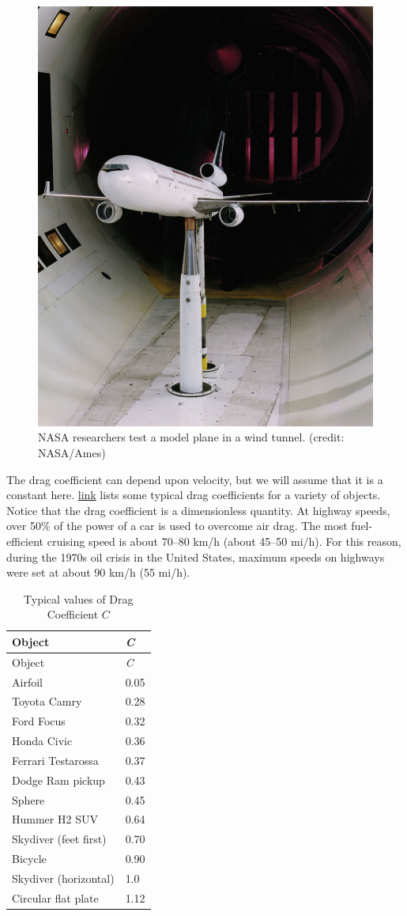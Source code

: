 \documentclass[
]{book}
\begin{document}
\begin{figure}
\hypertarget{import-auto-id1165298787035}{%
\centering
\includegraphics{images/Figure_06_02_03a.jpg}
\caption{NASA researchers test a model plane in a wind tunnel. (credit:
NASA/Ames)}\label{import-auto-id1165298787035}
}
\end{figure}

The drag coefficient can depend upon velocity, but we will assume that
it is a constant here.
\protect\hyperlink{import-auto-id1165298535568}{link} lists some
typical drag coefficients for a variety of objects. Notice that the drag
coefficient is a dimensionless quantity. At highway speeds, over 50\% of
the power of a car is used to overcome air drag. The most fuel-efficient
cruising speed is about 70--80 km/h (about 45--50 mi/h). For this
reason, during the 1970s oil crisis in the United States, maximum speeds
on highways were set at about 90 km/h (55 mi/h).

\begin{longtable}[]{@{}ll@{}}
\caption{{Typical values of Drag Coefficient \(C{}\)}}\tabularnewline
\toprule
Object & \emph{C}\tabularnewline
\midrule
\endfirsthead
\toprule
Object & \emph{C}\tabularnewline
\midrule
\endhead
Airfoil & 0.05\tabularnewline
Toyota Camry & 0.28\tabularnewline
Ford Focus & 0.32\tabularnewline
Honda Civic & 0.36\tabularnewline
Ferrari Testarossa & 0.37\tabularnewline
Dodge Ram pickup & 0.43\tabularnewline
Sphere & 0.45\tabularnewline
Hummer H2 SUV & 0.64\tabularnewline
Skydiver (feet first) & 0.70\tabularnewline
Bicycle & 0.90\tabularnewline
Skydiver (horizontal) & 1.0\tabularnewline
Circular flat plate & 1.12\tabularnewline
\bottomrule
\end{longtable}
\end{document}
